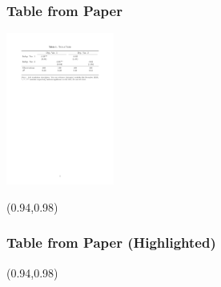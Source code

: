 \documentclass[12pt,aspectratio=169,xcolor=dvipsnames,hyperref={colorlinks=true,linkcolor=blue,citecolor=black}]{beamer}
\begin{document}
\begin{frame}[label=tableex]
	\frametitle{Table from Paper}
	\begin{center}
		\includegraphics[trim={3cm 21.15cm 3cm 3cm},clip,height=5cm,width=\textwidth,keepaspectratio]{../Tables/extabpdf.pdf}
	\end{center}
	
	\begin{textblock*}{3cm}(0.94\textwidth,0.98\textheight)	%
		\hyperlink{examples}{}
	\end{textblock*}
\end{frame}

\begin{frame}
	\frametitle{Table from Paper (Highlighted)}
	\vspace{-0.25cm}
	\hspace{0.55cm}
	
	\begin{textblock*}{3cm}(0.94\textwidth,0.98\textheight)	%
		\hyperlink{examples}{}
	\end{textblock*}
\end{frame}
\end{document}

